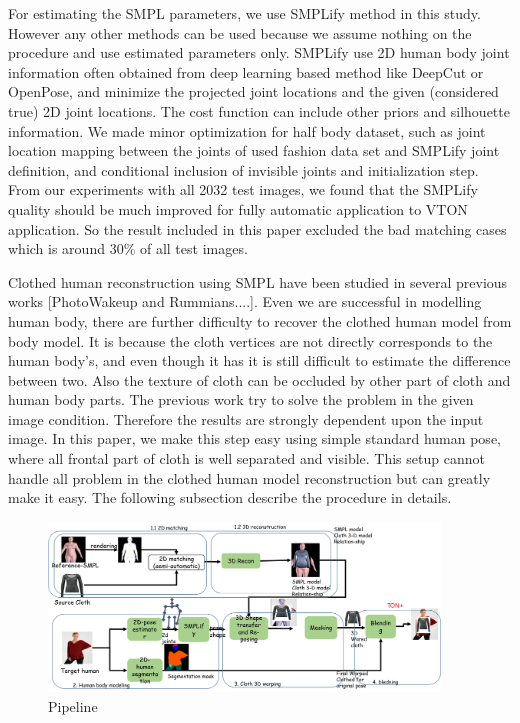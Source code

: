 \documentclass[runningheads]{llncs}
\begin{document}
For estimating the SMPL parameters, we use SMPLify method in this study. However any other methods can be used because we assume nothing on the procedure and use estimated parameters only. SMPLify use 2D human body joint information often obtained from deep learning based method like DeepCut or OpenPose, and minimize the projected joint locations and the given (considered true) 2D joint locations. The cost function can include other priors and silhouette information. We made minor optimization for half body dataset, such as joint location mapping between the joints of used fashion data set and SMPLify joint definition, and conditional inclusion of invisible joints and initialization step.  From our experiments with all 2032 test images, we found that the SMPLify quality should be much improved for fully automatic application to VTON application. So the result included in this paper excluded the bad matching cases which is around 30\% of all test images.    
  
Clothed human reconstruction using SMPL have been studied in several previous works [PhotoWakeup and Rummians....].
Even we are successful in modelling human body, there are further difficulty to recover the clothed human model from body model. It is because the cloth vertices are not directly corresponds to the human body's, and even though it has it is still difficult to estimate the difference between two. Also the texture of cloth can be occluded by other part of cloth and human body parts. The previous work try to solve the problem in the given image condition. Therefore the results are strongly dependent upon the input image.
In this paper, we make this step easy using simple standard human pose, where all frontal part of cloth is well separated and visible. This setup cannot handle all problem in the clothed human model reconstruction but can greatly make it easy.   
The following subsection describe the procedure in details.


\begin{figure}
\centering
\includegraphics[height=4.5cm]{figures/pipeline.png}   %
\caption{Pipeline}
\label{fig:piepline}
\end{figure}
\end{document}
